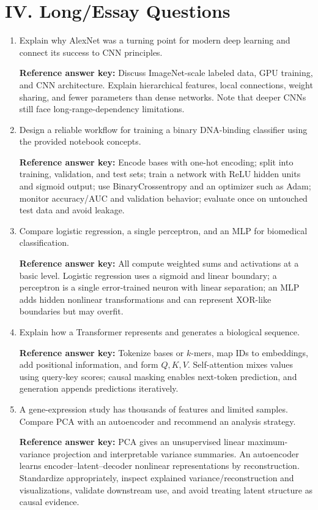 \documentclass[10pt,a4paper]{article}
\newcommand{\keyans}[1]{\par\textbf{Reference answer key:} #1}
\begin{document}
\section*{IV. Long/Essay Questions}
\begin{enumerate}[label=\textbf{\arabic*.},start=101,itemsep=8pt]
\item Explain why AlexNet was a turning point for modern deep learning and connect its success to CNN principles.
\keyans{Discuss ImageNet-scale labeled data, GPU training, and CNN architecture. Explain hierarchical features, local connections, weight sharing, and fewer parameters than dense networks. Note that deeper CNNs still face long-range-dependency limitations.}
\item Design a reliable workflow for training a binary DNA-binding classifier using the provided notebook concepts.
\keyans{Encode bases with one-hot encoding; split into training, validation, and test sets; train a network with ReLU hidden units and sigmoid output; use BinaryCrossentropy and an optimizer such as Adam; monitor accuracy/AUC and validation behavior; evaluate once on untouched test data and avoid leakage.}
\item Compare logistic regression, a single perceptron, and an MLP for biomedical classification.
\keyans{All compute weighted sums and activations at a basic level. Logistic regression uses a sigmoid and linear boundary; a perceptron is a single error-trained neuron with linear separation; an MLP adds hidden nonlinear transformations and can represent XOR-like boundaries but may overfit.}
\item Explain how a Transformer represents and generates a biological sequence.
\keyans{Tokenize bases or $k$-mers, map IDs to embeddings, add positional information, and form $Q,K,V$. Self-attention mixes values using query-key scores; causal masking enables next-token prediction, and generation appends predictions iteratively.}
\item A gene-expression study has thousands of features and limited samples. Compare PCA with an autoencoder and recommend an analysis strategy.
\keyans{PCA gives an unsupervised linear maximum-variance projection and interpretable variance summaries. An autoencoder learns encoder--latent--decoder nonlinear representations by reconstruction. Standardize appropriately, inspect explained variance/reconstruction and visualizations, validate downstream use, and avoid treating latent structure as causal evidence.}
\end{enumerate}
\end{document}
